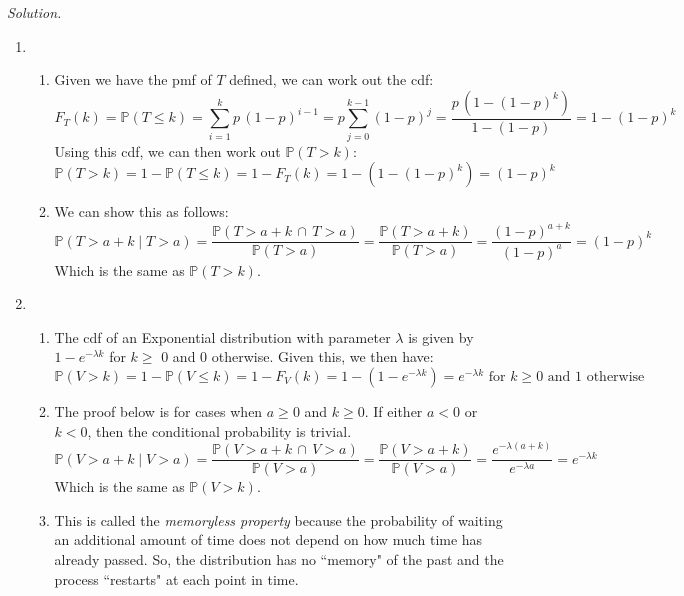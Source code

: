\documentclass[11pt]{article}
\newenvironment{solution}{%
  \noindent\textit{Solution.}\quad
}{\par\bigskip}
\begin{document}
\begin{solution}
\begin{enumerate}
      \item \begin{enumerate}[label=(\roman*)]
            \item Given we have the pmf of $T$ defined, we can work out the cdf:
                  \[
                  F_T(k) = \mathbb{P}(T \le k) = \sum_{i=1}^{k}{p \, (1 - p)^{i - 1}}
                        = p \sum_{j=0}^{k-1}{(1 - p)^{j}} = \frac{p \, (1 - (1 - p)^{k})}
                        {1 - (1 - p)} = {1 - (1 - p)^{k}}
                  \]
                  Using this cdf, we can then work out $\mathbb{P}(T > k)$:
                  \[
                  \mathbb{P}(T > k) = 1 - \mathbb{P}(T \le k) = 1 - F_T(k) = 
                        1 - \left({1 - (1 - p)^{k}}\right) = {(1 - p)^{k}}
                  \]
            \item We can show this as follows:
                  \[
                  \mathbb{P}(T > a + k \mid T > a) = \frac{\mathbb{P}(T > a + k
                        \, \cap \, T > a)}{\mathbb{P}(T > a)}
                        = \frac{\mathbb{P}(T > a + k)}{\mathbb{P}(T > a)}
                        = \frac{(1 - p)^{a + k}}{(1 - p)^{a}} = {(1 - p)^k}
                  \]
                  Which is the same as $\mathbb{P}(T > k)$.
            \end{enumerate}
      \item \begin{enumerate}[label=(\roman*)]
            \item The cdf of an Exponential distribution with parameter $\lambda$ 
                  is given by $1 - e^{-\lambda k}$ for $k \ge$ 0 and 0 otherwise.
                  Given this, we then have:
                  \[
                  \mathbb{P}(V > k) = 1 - \mathbb{P}(V \le k) = 1 - F_V(k) = 
                        1 - (1 - e^{-\lambda k}) = e^{-\lambda k} \text{ for } k 
                        \ge 0 \text{ and 1 otherwise}
                  \]
            \item The proof below is for cases when $a \ge 0$ and $k \ge 0$. If 
                  either $a < 0$ or $k < 0$, then the conditional probability is 
                  trivial.
                  \[
                  \mathbb{P}(V > a + k \mid V > a) = \frac{\mathbb{P}(V > a + k
                        \, \cap \, V > a)}{\mathbb{P}(V > a)}
                        = \frac{\mathbb{P}(V > a + k)}{\mathbb{P}(V > a)}
                        = \frac{e^{-\lambda(a + k)}}{e^{-\lambda a}} = 
                        {e^{-\lambda k}}
                  \]
                  Which is the same as $\mathbb{P}(V > k)$.
            \item This is called the \textit{memoryless property} because the 
                  probability of waiting an additional amount of time does not 
                  depend on how much time has already passed. So, the distribution 
                  has no ``memory" of the past and the process ``restarts" at 
                  each point in time.
            \end{enumerate}
\end{enumerate}
\end{solution}
\end{document}
